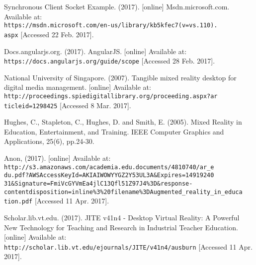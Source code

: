 \begin{thebibliography}{}
Synchronous Client Socket Example. (2017). [online] Msdn.microsoft.com. Available at: 
\\\texttt{https://msdn.microsoft.com/en-us/library/kb5kfec7(v=vs.110).\\aspx} [Accessed 22 Feb. 2017].

Docs.angularjs.org. (2017). AngularJS. [online] Available at: 
\\\texttt{https://docs.angularjs.org/guide/scope} [Accessed 28 Feb. 2017].


National University of Singapore. (2007). Tangible mixed reality desktop for digital media management. [online] Available at: 
\\\texttt{http://proceedings.spiedigitallibrary.org/proceeding.aspx?ar\\ticleid=1298425} [Accessed 8 Mar. 2017].

Hughes, C., Stapleton, C., Hughes, D. and Smith, E. (2005). Mixed Reality in Education, Entertainment, and Training. IEEE Computer Graphics and Applications, 25(6), pp.24-30.

Anon, (2017). [online] Available at: 
\\\texttt{http://s3.amazonaws.com/academia.edu.documents/4810740/ar\_e\\du.pdf?AWSAccessKeyId=AKIAIWOWYYGZ2Y53UL3A\&Expires=14919240\\31\&Signature=FmiVcGYVmEa4jlC13Qfl51Z97J4\%3D\&response-content\-disposition=inline\%3\%20filename\%3DAugmented\_reality\_in\_educa\\tion.pdf} [Accessed 11 Apr. 2017].

Scholar.lib.vt.edu. (2017). JITE v41n4 - Desktop Virtual Reality: A Powerful New Technology for Teaching and Research in Industrial Teacher Education. [online] Available at: 
\\\texttt{http://scholar.lib.vt.edu/ejournals/JITE/v41n4/ausburn} [Accessed 11 Apr. 2017].

\end{thebibliography}
